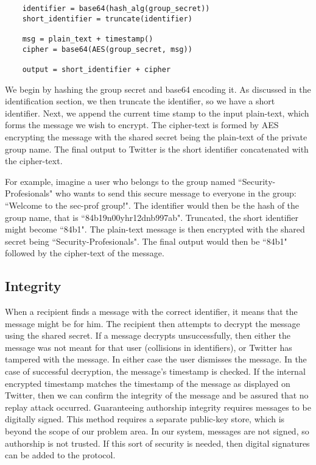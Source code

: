 \documentclass{article}
\begin{document}
\begin{verbatim}
	identifier = base64(hash_alg(group_secret))
	short_identifier = truncate(identifier)

	msg = plain_text + timestamp()
	cipher = base64(AES(group_secret, msg))

	output = short_identifier + cipher
\end{verbatim}

We begin by hashing the group secret and base64 encoding it. As discussed in the identification section, we then truncate the identifier, so we have a short identifier. Next, we append the current time stamp to the input plain-text, which forms the message we wish to encrypt. The cipher-text is formed by AES encrypting the message with the shared secret being the plain-text of the private group name. The final output to Twitter is the short identifier concatenated with the cipher-text.

For example, imagine a user who belongs to the group named ``Security-Profesionals" who wants to send this secure message to everyone in the group: ``Welcome to the sec-prof group!". The identifier would then be the hash of the group name, that is ``84b19n00yhr12dnb997ab". Truncated, the short identifier might become ``84b1". The plain-text message is then encrypted with the shared secret being ``Security-Profesionals". The final output would then be ``84b1" followed by the cipher-text of the message.

\subsection*{Integrity}

When a recipient finds a message with the correct identifier, it means that the message might be for him. The recipient then attempts to decrypt the message using the shared secret. If a message decrypts unsuccessfully, then either the message was not meant for that user (collisions in identifiers), or Twitter has tampered with the message. In either case the user dismisses the message. In the case of successful decryption, the message's timestamp is checked. If the internal encrypted timestamp matches the timestamp of the message as displayed on Twitter, then we can confirm the integrity of the message and be assured that no replay attack occurred. Guaranteeing authorship integrity requires messages to be digitally signed. This method requires a separate public-key store, which is beyond the scope of our problem area. In our system, messages are not signed, so authorship is not trusted. If this sort of security is needed, then digital signatures can be added to the protocol.
\end{document}
